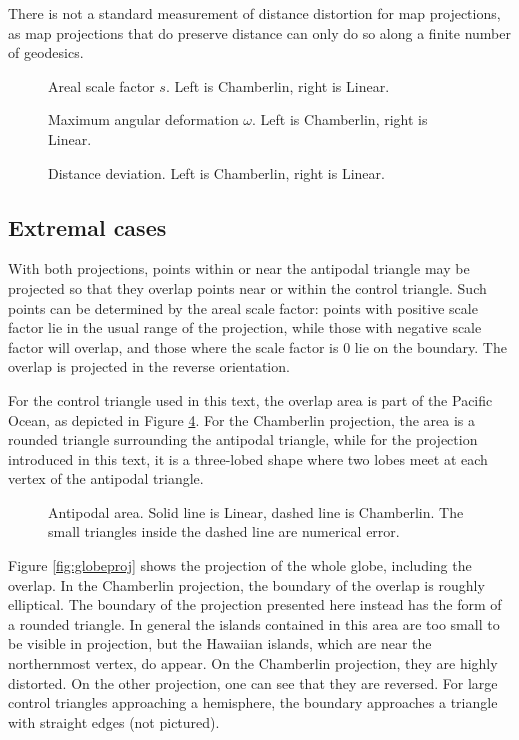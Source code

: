 \documentclass{amsart}[12pt]
\begin{document}
There is not a standard
measurement of distance distortion for map projections, as map projections that
do preserve distance can only do so along a finite number of geodesics.

\begin{figure}%

\caption{Areal scale factor $s$. Left is Chamberlin, right is Linear.}
\label{fig:scale}
\end{figure}

\begin{figure}%

\caption{Maximum angular deformation $\omega$. Left is Chamberlin, right is Linear.}
\label{fig:angle}
\end{figure}

\begin{figure}%

\caption{Distance deviation. Left is Chamberlin, right is Linear.}
\label{fig:distance}
\end{figure}

\subsection{Extremal cases}
With both projections, points within or near the antipodal triangle may be
projected so that they overlap points near or within the control triangle. Such
points can be determined by the areal scale factor: points with positive scale
factor lie in the usual range of the projection, while those with negative scale
factor will overlap, and those where the scale factor is 0 lie on the boundary.
The overlap is projected in the reverse orientation.

For the control triangle used in this text, the overlap area is part of the
Pacific Ocean, as depicted in Figure \ref{fig:antipodal}. For the Chamberlin
projection, the area is a rounded triangle surrounding the antipodal triangle,
while for the projection introduced in this text, it is a three-lobed shape
where two lobes meet at each vertex of the antipodal triangle.

\begin{figure}%

\caption{Antipodal area. Solid line is Linear, dashed line is Chamberlin. The
small triangles inside the dashed line are numerical error.}
\label{fig:antipodal}
\end{figure}

Figure \ref{fig:globeproj} shows the projection of the whole globe, including
the overlap.
In the Chamberlin projection, the boundary of the overlap is roughly elliptical.
The boundary of the projection presented here instead has the form of a
rounded triangle. In general the islands contained in this area are too small
to be visible in projection, but the Hawaiian islands, which are near the
northernmost vertex, do appear. On the Chamberlin projection, they are highly
distorted. On the other projection, one can see that they are reversed.
For large control triangles approaching a hemisphere, the
boundary approaches a triangle with straight edges (not pictured).
\end{document}
